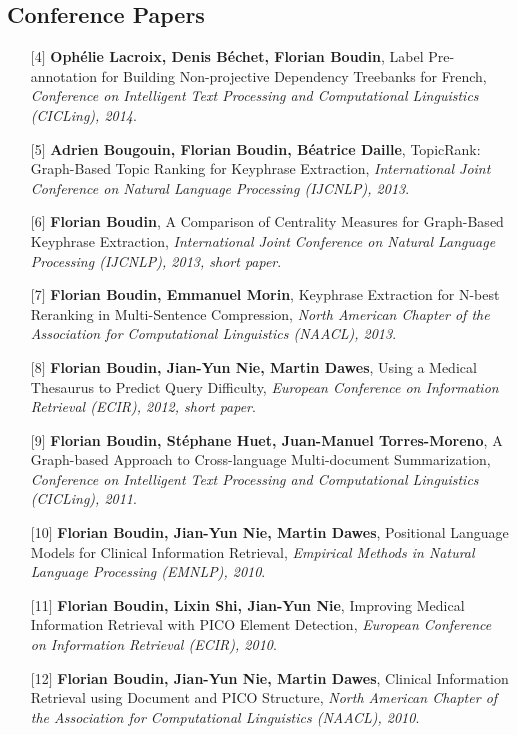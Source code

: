 \documentclass[11pt,a4paper]{moderncv}
\begin{document}
    \subsection{Conference Papers}
    \begin{itemize}[leftmargin=1.2cm,itemsep=0.1cm]
        \item[{\small$[$4$]$}] \textbf{Ophélie Lacroix, Denis Béchet, Florian Boudin}, Label Pre-annotation for Building Non-projective Dependency Treebanks for French, \textit{Conference on Intelligent Text Processing and Computational Linguistics (CICLing), 2014}.
        \item[{\small$[$5$]$}] \textbf{Adrien Bougouin, Florian Boudin, Béatrice Daille}, TopicRank: Graph-Based Topic Ranking for Keyphrase Extraction, \textit{International Joint Conference on Natural Language Processing (IJCNLP), 2013}.
        \item[{\small$[$6$]$}] \textbf{Florian Boudin}, A Comparison of Centrality Measures for Graph-Based Keyphrase Extraction, \textit{International Joint Conference on Natural Language Processing (IJCNLP), 2013, short paper}.
        \item[{\small$[$7$]$}] \textbf{Florian Boudin, Emmanuel Morin}, Keyphrase Extraction for N-best Reranking in Multi-Sentence Compression, \textit{North American Chapter of the Association for Computational Linguistics (NAACL), 2013}.
        \item[{\small$[$8$]$}] \textbf{Florian Boudin, Jian-Yun Nie, Martin Dawes}, Using a Medical Thesaurus to Predict Query Difficulty, \textit{European Conference on Information Retrieval (ECIR), 2012, short paper}.
        \item[{\small$[$9$]$}] \textbf{Florian Boudin, Stéphane Huet, Juan-Manuel Torres-Moreno}, A Graph-based Approach to Cross-language Multi-document Summarization, \textit{Conference on Intelligent Text Processing and Computational Linguistics (CICLing), 2011}.
        \item[{\small$[$10$]$}] \textbf{Florian Boudin, Jian-Yun Nie, Martin Dawes}, Positional Language Models for Clinical Information Retrieval, \textit{Empirical Methods in Natural Language Processing (EMNLP), 2010}.
        \item[{\small$[$11$]$}] \textbf{Florian Boudin, Lixin Shi, Jian-Yun Nie}, Improving Medical Information Retrieval with PICO Element Detection, \textit{European Conference on Information Retrieval (ECIR), 2010}.
        \item[{\small$[$12$]$}] \textbf{Florian Boudin, Jian-Yun Nie, Martin Dawes}, Clinical Information Retrieval using Document and PICO Structure, \textit{North American Chapter of the Association for Computational Linguistics (NAACL), 2010}.

\end{itemize}
\end{document}
